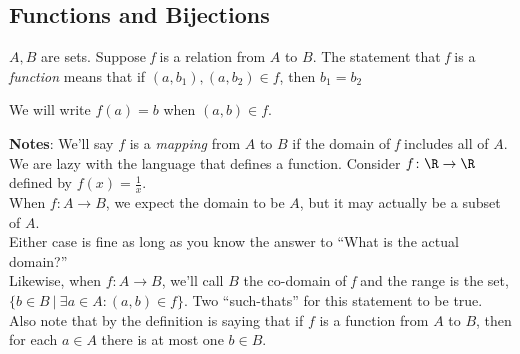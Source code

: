 \subsection{Functions and Bijections}

    \vspace{0.5cm}

            \begin{definition}
                {}$A,B$ are sets. Suppose \textit{f} is a relation from $A$ to $B$. The statement that \textit{f} is a \textit{function} means that if $(a,b_1),(a,b_2) \in f$, then $b_1 = b_2$
            \end{definition}
    
            \begin{notation}
                We will write $f(a) = b$ when $(a,b)\in f$.
            \end{notation}
    
            \textbf{Notes}: We'll say $f$ is a \textit{mapping} from $A$ to $B$ if the domain of \textit{f} includes all of $A$. \\
            \indent We are lazy with the language that defines a function. Consider $f\colon \R \rightarrow \R$ defined by $f(x) = \frac{1}{x}$. \\
            \indent When $f\colon A \rightarrow B$, we expect the domain to be $A$, but it may actually be a subset of $A$. \\
            \indent Either case is fine as long as you know the answer to ``What is the actual domain?'' \\
            \indent Likewise, when $f\colon A \rightarrow B$, we'll call $B$ the co-domain of \textit{f} and the range is the set, $\{b\in B \ | \ \exists a \in A \colon (a,b) \in f\}$. Two ``such-thats'' for this statement to be true. \\
            \indent Also note that by the definition is saying that if $f$ is a function from $A$ to $B$, then for each $a\in A$ there is at most one  $b\in B$.

            \vspace{0.5cm}

